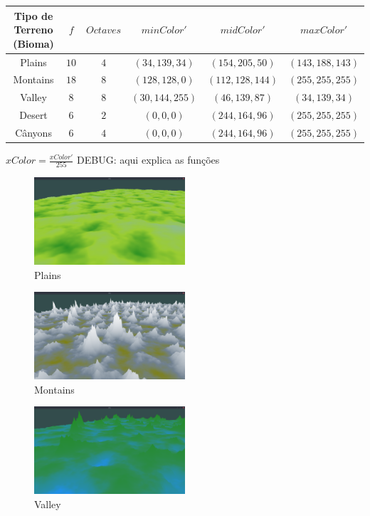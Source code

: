 \begin{tabular}{| c | c c c c c|}
    \hline
    Tipo de Terreno (Bioma) & $f$ & $Octaves$ & $minColor'$ & $midColor'$ & $maxColor'$\\
    \hline
    Plains   & $10$ & $4$ & $(34, 139, 34) $ & $(154, 205, 50) $ & $(143,188,143)  $  \\
    Montains & $18$ & $8$ & $(128, 128, 0) $ & $(112, 128, 144)$ & $(255, 255, 255)$  \\
    Valley   & $8$  & $8$ & $(30, 144, 255)$ & $(46, 139, 87)  $ & $(34, 139, 34)  $  \\
    Desert   & $6$  & $2$ & $(0, 0, 0)     $ & $(244, 164, 96) $ & $(255, 255, 255)$  \\
    Cânyons  & $6$  & $4$ & $(0, 0, 0)     $ & $(244, 164, 96) $ & $(255, 255, 255)$  \\
    
    \hline
\end{tabular}

$xColor = \frac{xColor'}{255}$
DEBUG: aqui explica as funções

\begin{figure}[H]
    \centering
    \includegraphics[width=0.5\textwidth]{figuras/bssPlains.png}
    \caption{Plains}
    \label{fig:bssPlains}
\end{figure}



\begin{figure}[H]
    \centering
    \includegraphics[width=0.5\textwidth]{figuras/bssMontains.png}
    \caption{Montains}
    \label{fig:bssMontains}
\end{figure}



\begin{figure}[H]
    \centering
    \includegraphics[width=0.5\textwidth]{figuras/bssValley.png}
    \caption{Valley}
    \label{fig:bssValley}
\end{figure}



